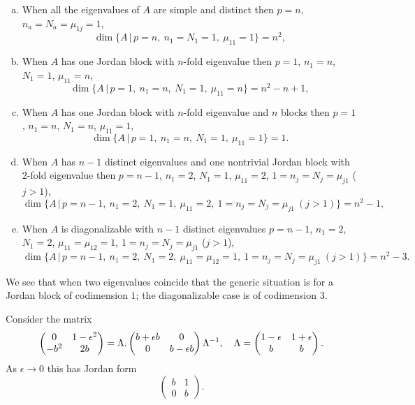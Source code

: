 \documentclass{article}
\begin{document}
\begin{enumerate}[(a)]
	\item When all the eigenvalues of $A$ are simple and distinct then $p=n$, $n_a=N_a=\mu_{1j}=1$,
	$$\dim \{A\,|\, p=n,\   n_1=N_1=1,\  \mu_{11}=1   \}= n^2,$$
	
	\item When  $A$  has one Jordan block with $n$-fold eigenvalue
	then $p=1$, $n_1=n$, $N_1=1$, $\mu_{11}=n$,
	$$\dim \{A\,|\, p=1,\   n_1=n,\ N_1=1,\  \mu_{11}=n    \}= n^2-n+1,$$
	
	\item When  $A$  has one Jordan block with $n$-fold eigenvalue and $n$ blocks
	then $p=1$, $n_1=n$, $N_1=n$, $\mu_{11}=1$,
	$$\dim \{A\,|\, p=1,\   n_1=n,\ N_1=1,\  \mu_{11}=1    \}= 1.$$
	
	\item When  $A$  has $n-1$ distinct eigenvalues and one nontrivial Jordan block with $2$-fold eigenvalue
	then $p=n-1$, $n_1=2$, $N_1=1$, $\mu_{11}=2$,  $1=n_j=N_j=\mu_{j1}$ ($j>1$),
	$$\dim \{A\,|\, p=n-1,\ n_1=2,\ N_1=1,\ \mu_{11}=2,\ 1=n_j=N_j=\mu_{j1}\ (j>1)   \}= n^2-1,$$
	
	\item When  $A$  is diagonalizable with $n-1$ distinct eigenvalues $p=n-1$, $n_1=2$, $N_1=2$, $\mu_{11}=\mu_{12}=1$,  $1=n_j=N_j=\mu_{j1}$ ($j>1$),
	$$\dim \{A\,|\, p=n-1,\ n_1=2,\ N_1=2,\ \mu_{11}=\mu_{12}=1,\ 1=n_j=N_j =\mu_{j1}\ (j>1)   \}= n^2-3.$$
	
\end{enumerate}

We see that when two eigenvalues coincide that the generic situation is for a Jordan block of codimension $1$; the diagonalizable case is of codimension $3$.

Consider the matrix 
$$\begin{pmatrix}0&1-\epsilon^2\\ -b^2 &2b\end{pmatrix}=\Lambda.
\begin{pmatrix}b+\epsilon b&0\\ 0&b-\epsilon b \end{pmatrix}\Lambda\sp{-1},\quad
\Lambda=\begin{pmatrix}1-\epsilon&1+\epsilon\\  b&b\end{pmatrix}.
$$
As $\epsilon\rightarrow0$ this has Jordan form
$$\begin{pmatrix}b&1\\0&b\end{pmatrix}.$$
\end{document}
